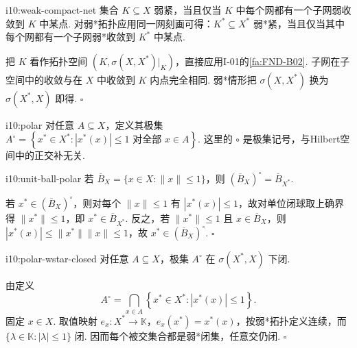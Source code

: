 \begin{FAProposition}[C][紧性的网形式]{i10:weak-compact-net}
集合 \(\displaystyle K\subseteq X\) 弱紧，当且仅当 \(\displaystyle K\) 中每个网都有一个子网弱收敛到 \(\displaystyle K\) 中某点. 对弱*拓扑应用同一网刻画可得：\(\displaystyle K^*\subseteq X^*\) 弱*紧，当且仅当其中每个网都有一个子网弱*收敛到 \(\displaystyle K^*\) 中某点.
\end{FAProposition}

\begin{FAProof}
把 \(\displaystyle K\) 看作拓扑空间 \(\displaystyle (K,\sigma(X,X^*)|_K)\)，直接应用I-01的\autoref{fa:FND-B02}. 子网在子空间中的收敛与在 \(\displaystyle X\) 中收敛到 \(\displaystyle K\) 内点完全相同. 弱*情形把 \(\displaystyle \sigma(X,X^*)\) 换为 \(\displaystyle \sigma(X^*,X)\) 即得.
\hfill\(\square\)
\end{FAProof}

\begin{FADefinition}[B][极集]{i10:polar}
对任意 \(\displaystyle A\subseteq X\)，定义其极集
\(\displaystyle A^\circ = \left\{x^*\in X^*:|x^*(x)|\leqslant1\text{ 对全部 }x\in A\right\}\).
这里的 \(\displaystyle \circ\) 是极集记号，与Hilbert空间中的正交补无关.
\end{FADefinition}

\begin{FAProposition}[B][闭单位球的极集]{i10:unit-ball-polar}
若 \(\displaystyle \overline B_X=\{x\in X:\|x\|\leqslant1\}\)，则
\(\displaystyle (\overline B_X)^\circ=\overline B_{X^*}\).
\end{FAProposition}

\begin{FAProof}
若 \(\displaystyle x^*\in(\overline B_X)^\circ\)，则对每个 \(\displaystyle \|x\|\leqslant1\) 有 \(\displaystyle |x^*(x)|\leqslant1\)，故对单位闭球取上确界得 \(\displaystyle \|x^*\|\leqslant1\)，即 \(\displaystyle x^*\in\overline B_{X^*}\). 反之，若 \(\displaystyle \|x^*\|\leqslant1\) 且 \(\displaystyle x\in\overline B_X\)，则 \(\displaystyle |x^*(x)|\leqslant\|x^*\|\|x\|\leqslant1\)，故 \(\displaystyle x^*\in(\overline B_X)^\circ\).
\hfill\(\square\)
\end{FAProof}

\begin{FAProposition}[B][极集的弱*闭性]{i10:polar-wstar-closed}
对任意 \(\displaystyle A\subseteq X\)，极集 \(\displaystyle A^\circ\) 在 \(\displaystyle \sigma(X^*,X)\) 下闭.
\end{FAProposition}

\begin{FAProof}
由定义
\[
A^\circ
=
\bigcap_{x\in A}
\left\{x^*\in X^*:|x^*(x)|\leqslant1\right\}.
\]
固定 \(\displaystyle x\in X\). 取值映射 \(\displaystyle e_x:X^*\to\mathbb K\)，\(\displaystyle e_x(x^*)=x^*(x)\)，按弱*拓扑定义连续，而 \(\displaystyle \{\lambda\in\mathbb K:|\lambda|\leqslant1\}\) 闭. 因而每个被交集合都是弱*闭集，任意交仍闭.
\hfill\(\square\)
\end{FAProof}

